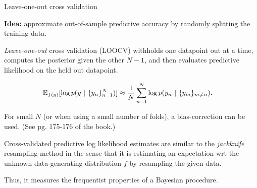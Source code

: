 \documentclass[aspectratio=169]{beamer}
\begin{document}
\begin{frame}{Leave-one-out cross validation}
    
    \textbf{Idea: } approximate out-of-sample predictive accuracy by randomly splitting the training data. 
    
    \textit{Leave-one-out} cross validation (LOOCV) withholds one datapoint out at a time, computes the posterior given the other $N-1$, and then evaluates predictive likelihood on the held out datapoint.
    
    \begin{align}
        \mathbb{E}_{f(y)}[\log p(y ~\vert~ \{y_n\}_{n=1}^N)] &\approx
        \frac{1}{N} \sum_{n=1}^N \log p(y_n ~\vert~ \{y_m\}_{m\neq n}).
    \end{align}
    
    For small $N$ (or when using a small number of folds), a bias-correction can be used. (See pg. 175-176 of the book.)
    
    Cross-validated predictive log likelihood estimates are similar to the \emph{jackknife} resampling method in the sense that it is estimating an expectation wrt the unknown data-generating distribution $f$ by resampling the given data. 
    
    Thus, it measures the frequentist properties of a Bayesian procedure.
    
\end{frame}

    
\end{document}
